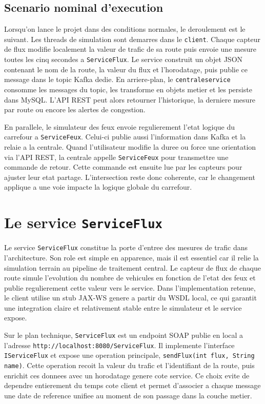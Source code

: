 \documentclass[12pt,a4paper]{report}
\begin{document}
\section*{Scenario nominal d'execution}
Lorsqu'on lance le projet dans des conditions normales, le deroulement est le suivant. Les threads de simulation sont demarres dans le \texttt{client}. Chaque capteur de flux modifie localement la valeur de trafic de sa route puis envoie une mesure toutes les cinq secondes a \texttt{ServiceFlux}. Le service construit un objet JSON contenant le nom de la route, la valeur du flux et l'horodatage, puis publie ce message dans le topic Kafka dedie. En arriere-plan, le \texttt{centraleservice} consomme les messages du topic, les transforme en objets metier et les persiste dans MySQL. L'API REST peut alors retourner l'historique, la derniere mesure par route ou encore les alertes de congestion.

En parallele, le simulateur des feux envoie regulierement l'etat logique du carrefour a \texttt{ServiceFeux}. Celui-ci publie aussi l'information dans Kafka et la relaie a la centrale. Quand l'utilisateur modifie la duree ou force une orientation via l'API REST, la centrale appelle \texttt{ServiceFeux} pour transmettre une commande de retour. Cette commande est ensuite lue par les capteurs pour ajuster leur etat partage. L'intersection reste donc coherente, car le changement applique a une voie impacte la logique globale du carrefour.

\chapter{Le service \texttt{ServiceFlux}}
Le service \texttt{ServiceFlux} constitue la porte d'entree des mesures de trafic dans l'architecture. Son role est simple en apparence, mais il est essentiel car il relie la simulation terrain au pipeline de traitement central. Le capteur de flux de chaque route simule l'evolution du nombre de vehicules en fonction de l'etat des feux et publie regulierement cette valeur vers le service. Dans l'implementation retenue, le client utilise un stub JAX-WS genere a partir du WSDL local, ce qui garantit une integration claire et relativement stable entre le simulateur et le service expose.

Sur le plan technique, \texttt{ServiceFlux} est un endpoint SOAP publie en local a l'adresse \texttt{http://localhost:8080/ServiceFlux}. Il implemente l'interface \texttt{IServiceFlux} et expose une operation principale, \texttt{sendFlux(int flux, String name)}. Cette operation recoit la valeur du trafic et l'identifiant de la route, puis enrichit ces donnees avec un horodatage genere cote service. Ce choix evite de dependre entierement du temps cote client et permet d'associer a chaque message une date de reference unifiee au moment de son passage dans la couche metier.
\end{document}
